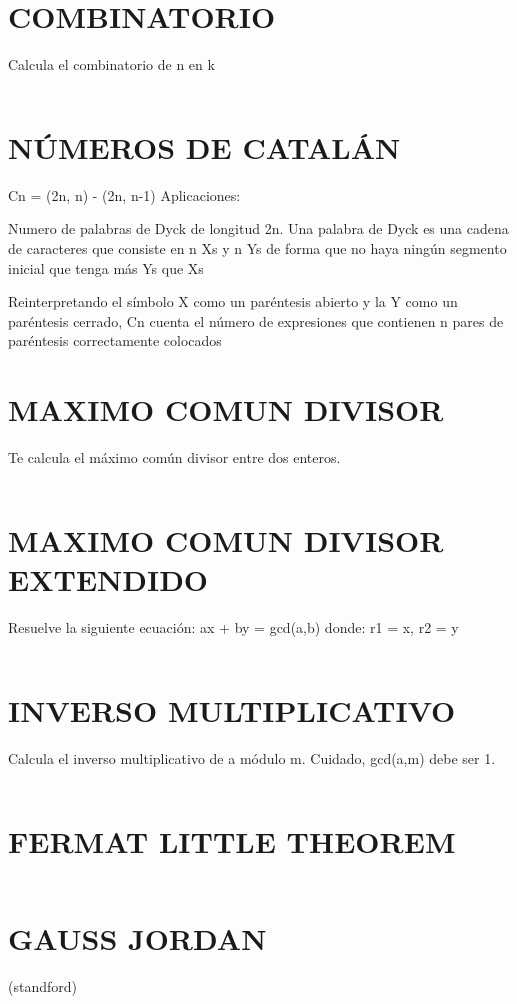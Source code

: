 \documentclass{article}
\begin{document}
\section*{COMBINATORIO}
Calcula el combinatorio de n en k
\inputminted[]{c++}{algorithms/COMBDP.cpp}

\section*{N\'UMEROS DE CATAL\'AN}
Cn = (2n, n) - (2n, n-1)
Aplicaciones:

Numero de palabras de Dyck de longitud 2n. Una palabra de Dyck es una cadena de caracteres que consiste en n Xs y n Ys de forma que no haya ning\'un segmento inicial que tenga m\'as Ys que Xs

Reinterpretando el s\'imbolo X como un par\'entesis abierto y la Y como un par\'entesis cerrado, Cn cuenta el n\'umero de expresiones que contienen n pares de par\'entesis correctamente colocados



\section*{MAXIMO COMUN DIVISOR}
Te calcula el m\'aximo com\'un divisor entre dos enteros.
\inputminted[]{c++}{algorithms/GCD.cpp}

\section*{MAXIMO COMUN DIVISOR EXTENDIDO}
Resuelve la siguiente ecuaci\'on:
ax + by = gcd(a,b)
donde:
r1 = x, r2 = y
\inputminted[]{c++}{algorithms/EXTENDEDGCD.cpp}
\newpage

\section*{INVERSO MULTIPLICATIVO}
Calcula el inverso multiplicativo de a m\'odulo m.
Cuidado, gcd(a,m) debe ser 1.
\inputminted[]{c++}{algorithms/MULTIPLICATIVEINVERSE.cpp}

\section*{FERMAT LITTLE THEOREM}
\inputminted[]{c++}{algorithms/FERMAT.cpp}
\newpage

\section*{GAUSS JORDAN}
(standford)
\inputminted[]{c++}{algorithms/GAUSSJORDAN.cpp}
\newpage
\end{document}
